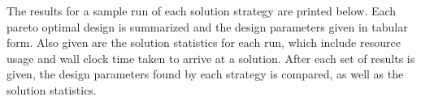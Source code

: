 The results for a sample run of each solution strategy are printed below. Each pareto optimal design is summarized and the design parameters given in tabular form. Also given are the solution statistics for each run, which include resource usage and wall clock time taken to arrive at a solution. After each set of results is given, the design parameters found by each strategy is compared, as well as the solution statistics. 
